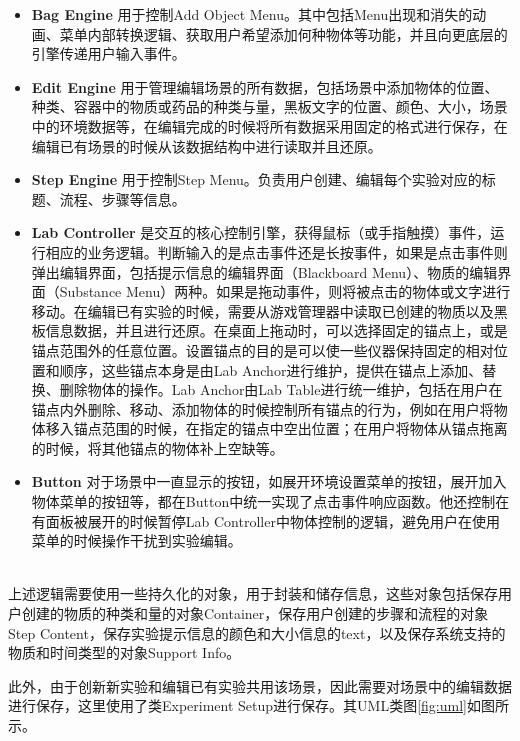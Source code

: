 \begin{itemize}
    \item \textbf{Bag Engine}
用于控制Add Object Menu。其中包括Menu出现和消失的动画、菜单内部转换逻辑、获取用户希望添加何种物体等功能，并且向更底层的引擎传递用户输入事件。
    
    \item \textbf{Edit Engine}
用于管理编辑场景的所有数据，包括场景中添加物体的位置、种类、容器中的物质或药品的种类与量，黑板文字的位置、颜色、大小，场景中的环境数据等，在编辑完成的时候将所有数据采用固定的格式进行保存，在编辑已有场景的时候从该数据结构中进行读取并且还原。
    
    \item \textbf{Step Engine}
用于控制Step Menu。负责用户创建、编辑每个实验对应的标题、流程、步骤等信息。

    \item \textbf{Lab Controller}
是交互的核心控制引擎，获得鼠标（或手指触摸）事件，运行相应的业务逻辑。判断输入的是点击事件还是长按事件，如果是点击事件则弹出编辑界面，包括提示信息的编辑界面（Blackboard Menu）、物质的编辑界面（Substance Menu）两种。如果是拖动事件，则将被点击的物体或文字进行移动。在编辑已有实验的时候，需要从游戏管理器中读取已创建的物质以及黑板信息数据，并且进行还原。在桌面上拖动时，可以选择固定的锚点上，或是锚点范围外的任意位置。设置锚点的目的是可以使一些仪器保持固定的相对位置和顺序，这些锚点本身是由Lab Anchor进行维护，提供在锚点上添加、替换、删除物体的操作。Lab Anchor由Lab Table进行统一维护，包括在用户在锚点内外删除、移动、添加物体的时候控制所有锚点的行为，例如在用户将物体移入锚点范围的时候，在指定的锚点中空出位置；在用户将物体从锚点拖离的时候，将其他锚点的物体补上空缺等。

    \item \textbf{Button}
对于场景中一直显示的按钮，如展开环境设置菜单的按钮，展开加入物体菜单的按钮等，都在Button中统一实现了点击事件响应函数。他还控制在有面板被展开的时候暂停Lab Controller中物体控制的逻辑，避免用户在使用菜单的时候操作干扰到实验编辑。
\end{itemize}
~\\
\indent    	上述逻辑需要使用一些持久化的对象，用于封装和储存信息，这些对象包括保存用户创建的物质的种类和量的对象Container，保存用户创建的步骤和流程的对象Step Content，保存实验提示信息的颜色和大小信息的text，以及保存系统支持的物质和时间类型的对象Support Info。

此外，由于创新新实验和编辑已有实验共用该场景，因此需要对场景中的编辑数据进行保存，这里使用了类Experiment Setup进行保存。其UML类图\ref{fig:uml}如图所示。


